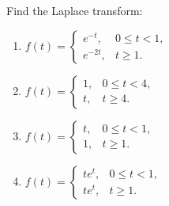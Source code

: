 \documentclass{ximera}
\begin{document}
\begin{problem}\label{exer:8.1.5}
 Find the Laplace transform:

\begin{enumerate}
    \item $f(t)=\left\{\begin{array}{rl} e^{-t}, &
0\le t<1,\\ e^{-2t}, & t\ge 1.\end{array}\right.$ 


    \item $f(t)=\left\{\begin{array}{rl} 1, & 0\le t<
4,\\ t, & t\ge 4.\end{array}\right.$


    \item $f(t)=\left\{\begin{array}{rl} t, & 0\le
t<1,\\ 1, & t\ge 1.\end{array}\right.$


    \item $f(t)=\left\{\begin{array}{rl} te^t, & 0\le
t<1,\\t e^t, & t\ge 1.\end{array}\right.$


\end{enumerate}
\end{problem}
\end{document}
